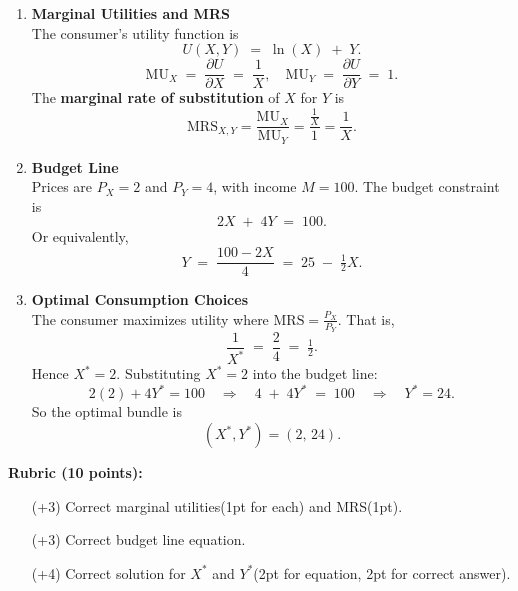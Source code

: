 \documentclass[12pt]{article}
\begin{document}
\begin{enumerate}[label=(\alph*)]
    \item \textbf{Marginal Utilities and MRS} \\
    The consumer's utility function is
    \[
    U(X,Y) \;=\;\ln(X)\;+\;Y.
    \]
    \[
    \text{MU}_X \;=\;\frac{\partial U}{\partial X}\;=\;\frac{1}{X}, 
    \quad
    \text{MU}_Y \;=\;\frac{\partial U}{\partial Y}\;=\;1.
    \]
    The \textbf{marginal rate of substitution} of $X$ for $Y$ is
    \[
    \text{MRS}_{X,Y} = \frac{\text{MU}_X}{\text{MU}_Y} = \frac{\tfrac{1}{X}}{1} = \frac{1}{X}.
    \]

    \item \textbf{Budget Line} \\
    Prices are $P_X=2$ and $P_Y=4$, with income $M=100$. The budget constraint is
    \[
    2X \;+\;4Y \;=\;100.
    \]
    Or equivalently,
    \[
    Y \;=\;\frac{100 - 2X}{4} \;=\;25 \;-\;\tfrac{1}{2}X.
    \]

    \item \textbf{Optimal Consumption Choices }\\
    The consumer maximizes utility where $\text{MRS}=\frac{P_X}{P_Y}$. That is,
    \[
    \frac{1}{X^*} \;=\;\frac{2}{4}\;=\;\tfrac12.
    \]
    Hence $X^* = 2$. Substituting $X^*=2$ into the budget line:
    \[
    2(2) + 4Y^* = 100
    \quad\Longrightarrow\quad
    4 \;+\;4Y^*\;=\;100
    \quad\Longrightarrow\quad
    Y^*=24.
    \]
    So the optimal bundle is
    \[
    (X^*, Y^*) = (2,\,24).
    \]
\end{enumerate}

\vspace{1em}
\noindent
\textbf{Rubric (10 points):}
\begin{itemize}[noitemsep]
    \item[(+3)] Correct marginal utilities(1pt for each) and MRS(1pt).
    \item[(+3)] Correct budget line equation.
    \item[(+4)] Correct solution for $X^*$ and $Y^*$(2pt for equation, 2pt for correct answer).
\end{itemize}
\end{document}
